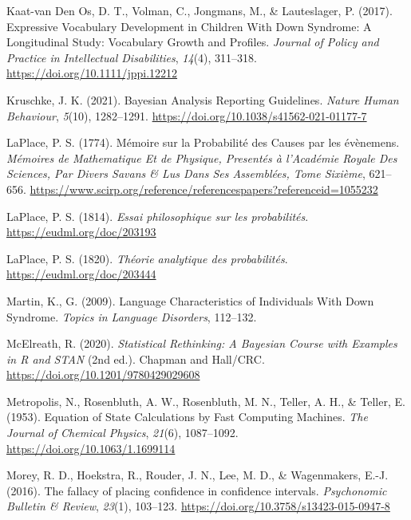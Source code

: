 \documentclass[
  11pt,
  a4paper,
]{report}
\newlength{\cslhangindent}
\newenvironment{CSLReferences}[2] %
 {\begin{list}{}{%
  \setlength{\itemindent}{0pt}
  \setlength{\leftmargin}{0pt}
  \setlength{\parsep}{0pt}
  \ifodd #1
   \setlength{\leftmargin}{\cslhangindent}
   \setlength{\itemindent}{-1\cslhangindent}
  \fi
  \setlength{\itemsep}{#2\baselineskip}}}
 {\end{list}}
\begin{document}
\begin{CSLReferences}{1}{0}
Kaat-van Den Os, D. T., Volman, C., Jongmans, M., \& Lauteslager, P.
(2017). Expressive {Vocabulary Development} in {Children With Down
Syndrome}: {A Longitudinal Study}: {Vocabulary Growth} and {Profiles}.
\emph{Journal of Policy and Practice in Intellectual Disabilities},
\emph{14}(4), 311--318. \url{https://doi.org/10.1111/jppi.12212}

Kruschke, J. K. (2021). Bayesian {Analysis Reporting Guidelines}.
\emph{Nature Human Behaviour}, \emph{5}(10), 1282--1291.
\url{https://doi.org/10.1038/s41562-021-01177-7}

LaPlace, P. S. (1774). Mémoire sur la {Probabilité} des {Causes} par les
évènemens. \emph{Mémoires de Mathematique Et de Physique, Presentés à
l'Académie Royale Des Sciences, Par Divers Savans \& Lus Dans Ses
Assemblées, Tome Sixième}, 621--656.
\url{https://www.scirp.org/reference/referencespapers?referenceid=1055232}

LaPlace, P. S. (1814). \emph{Essai philosophique sur les probabilités}.
\url{https://eudml.org/doc/203193}

LaPlace, P. S. (1820). \emph{Théorie analytique des probabilités}.
\url{https://eudml.org/doc/203444}

Martin, K., G. (2009). Language {Characteristics} of {Individuals With
Down Syndrome}. \emph{Topics in Language Disorders}, 112--132.

McElreath, R. (2020). \emph{Statistical {Rethinking}: {A Bayesian
Course} with {Examples} in {R} and {STAN}} (2nd ed.). {Chapman and
Hall/CRC}. \url{https://doi.org/10.1201/9780429029608}

Metropolis, N., Rosenbluth, A. W., Rosenbluth, M. N., Teller, A. H., \&
Teller, E. (1953). Equation of {State Calculations} by {Fast Computing
Machines}. \emph{The Journal of Chemical Physics}, \emph{21}(6),
1087--1092. \url{https://doi.org/10.1063/1.1699114}

Morey, R. D., Hoekstra, R., Rouder, J. N., Lee, M. D., \& Wagenmakers,
E.-J. (2016). The fallacy of placing confidence in confidence intervals.
\emph{Psychonomic Bulletin \& Review}, \emph{23}(1), 103--123.
\url{https://doi.org/10.3758/s13423-015-0947-8}


\end{CSLReferences}
\end{document}

